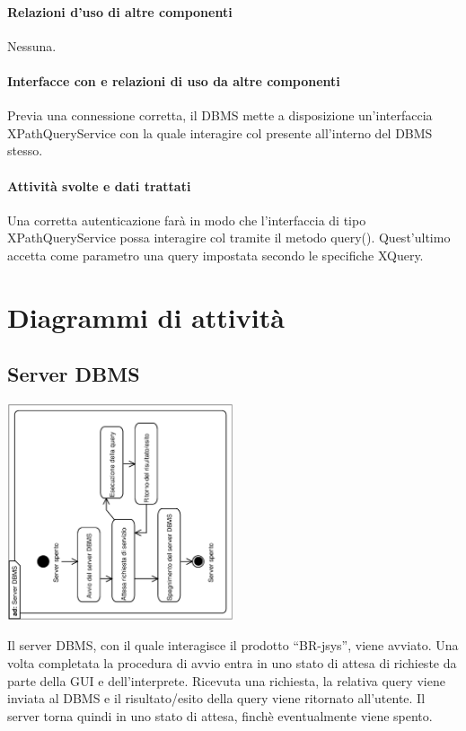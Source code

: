 \documentclass[11pt,titlepage,a4paper]{report}
\begin{document}
\subsubsection{Relazioni d'uso di altre componenti}
Nessuna.
\subsubsection{Interfacce con e relazioni di uso da altre componenti}
Previa una connessione corretta, il DBMS mette a disposizione un'interfaccia XPathQueryService con la quale interagire col \re  presente all'interno del DBMS stesso.
\subsubsection{Attivit\`a svolte e dati trattati}
Una corretta autenticazione far\`a in modo che l'interfaccia di tipo XPathQueryService possa interagire col \re tramite il metodo query(). Quest'ultimo accetta come parametro una query impostata secondo le specifiche XQuery.


\chapter{Diagrammi di attivit\`a}


\section{Server DBMS}
\begin{center}
 \includegraphics[width=0.5\textwidth, angle=-90]{Server.eps}
\end{center}
Il server DBMS, con il quale interagisce il prodotto ``BR-jsys'', viene avviato. Una volta completata la procedura di avvio entra in uno stato di attesa di richieste da parte della GUI e dell'interprete. Ricevuta una richiesta, la relativa query viene inviata al DBMS e il risultato/esito della query viene ritornato all'utente. Il server torna quindi in uno stato di attesa, finch\`e eventualmente viene spento.
\end{document}
